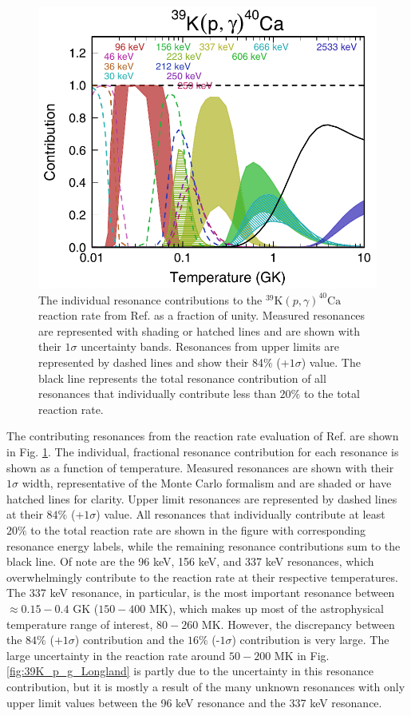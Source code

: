 \begin{figure}
\centering
\includegraphics[width=5in]{Chapter-6/figs/Contrib_Longland2018.png}
\caption{\label{fig:contrib_longland2018}The individual resonance contributions to the $^{39}\mathrm{K}(p,\gamma)^{40}\mathrm{Ca}$ reaction rate from Ref. \cite{Longland2018} as a fraction of unity. Measured resonances are represented with shading or hatched lines and are shown with their $1\sigma$ uncertainty bands. Resonances from upper limits are represented by dashed lines and show their 84$\%$ (+$1\sigma$) value. The black line represents the total resonance contribution of all resonances that individually contribute less than $20\%$ to the total reaction rate.}
\end{figure}

The contributing resonances from the reaction rate evaluation of Ref. \cite{Longland2018} are shown in Fig. \ref{fig:contrib_longland2018}. The individual, fractional resonance contribution for each resonance is shown as a function of temperature. Measured resonances are shown with their $1\sigma$ width, representative of the Monte Carlo formalism \cite{Longland2010a} and are shaded or have hatched lines for clarity. Upper limit resonances are represented by dashed lines at their $84\%$ (+$1\sigma$) value. All resonances that individually contribute at least $20\%$ to the total reaction rate are shown in the figure with corresponding resonance energy labels, while the remaining resonance contributions sum to the black line. Of note are the 96 keV, 156 keV, and 337 keV resonances, which overwhelmingly contribute to the reaction rate at their respective temperatures. The 337 keV resonance, in particular, is the most important resonance between $\approx 0.15-0.4$ GK ($150-400$ MK), which makes up most of the astrophysical temperature range of interest, $80-260$ MK. However, the discrepancy between the $84\%$ ($+1\sigma$) contribution and the $16\%$ (-$1\sigma$) contribution is very large. The large uncertainty in the reaction rate around $50-200$ MK in Fig. \ref{fig:39K_p_g_Longland} is partly due to the uncertainty in this resonance contribution, but it is mostly a result of the many unknown resonances with only upper limit values between the 96 keV resonance and the 337 keV resonance.

